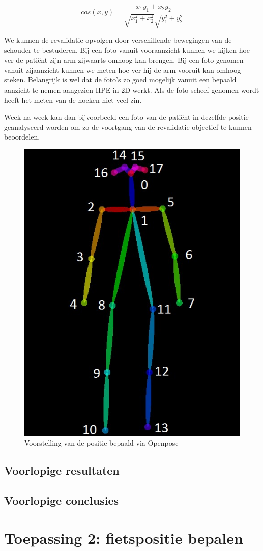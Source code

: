 \documentclass{article}
\begin{document}
\begin{equation}
	cos(x,y) = \frac{x_1y_1+x_2y_2}{\sqrt{x_1^2+x_2^2} \sqrt{y_1^2+y_2^2}}
	\label{eq:cos}
\end{equation}

We kunnen de revalidatie opvolgen door verschillende bewegingen van de schouder te bestuderen. Bij een foto vanuit vooraanzicht kunnen we kijken hoe ver de patiënt zijn arm zijwaarts omhoog kan brengen. Bij een foto genomen vanuit zijaanzicht kunnen we meten hoe ver hij de arm vooruit kan omhoog steken. Belangrijk is wel dat de foto's zo goed mogelijk vanuit een bepaald aanzicht te nemen aangezien HPE in 2D werkt. Als de foto scheef genomen wordt heeft het meten van de hoeken niet veel zin.

Week na week kan dan bijvoorbeeld een foto van de patiënt in dezelfde positie geanalyseerd worden om zo de voortgang van de revalidatie objectief te kunnen beoordelen. 

\begin{figure}[H]
	\centering
	\caption{Voorstelling van de positie bepaald via Openpose}
	\label{fig:skelet}
	\includegraphics[width=.5\textwidth]{HPE_skelet}
\end{figure}


	\subsection{Voorlopige resultaten}

	\subsection{Voorlopige conclusies}

\section{Toepassing 2: fietspositie bepalen}
\end{document}
